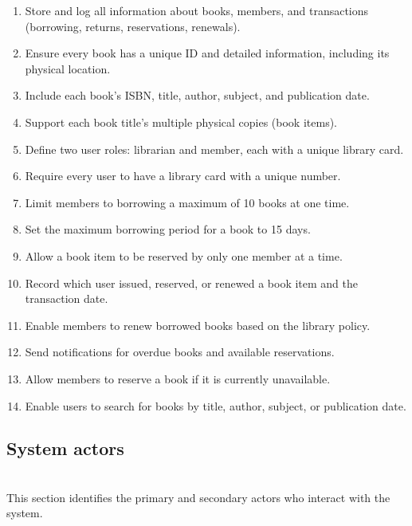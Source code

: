 \begin{enumerate}
\item
\protect{}\label{E0e4Mv41EXcNSpBeE1VU5}
Store and log all information about books, members, and transactions (borrowing, returns, reservations, renewals).
\item
\protect{}\label{2FnlvLQLyZUeJ55hdwNen}
Ensure every book has a unique ID and detailed information, including its physical location.
\item
\protect{}\label{qKTF5Ua5VyPJ6Uk3GGml0}
Include each book's ISBN, title, author, subject, and publication date.
\item
\protect{}\label{C4EsN9UHeox9osbiyhEHp}
Support each book title's multiple physical copies (book items).
\item
\protect{}\label{z6bz5WVmJlTcYEC7a_YZR}
Define two user roles: librarian and member, each with a unique library card.
\item
\protect{}\label{XsPqfVc9xmpdPGaSpIfcD}
Require every user to have a library card with a unique number.
\item
\protect{}\label{BsTG1re3UsRfRmbF-NLch}
Limit members to borrowing a maximum of 10 books at one time.
\item
\protect{}\label{hGjCag1fvoY9gC7k51-_b}
Set the maximum borrowing period for a book to 15 days.
\item
\protect{}\label{yk4tBno3dlZGtDR4sP2Iv}
Allow a book item to be reserved by only one member at a time.
\item
\protect{}\label{mRtzddxsrS84b1jXu2QZ5}
Record which user issued, reserved, or renewed a book item and the transaction date.
\item
\protect{}\label{s2KAp1nIjGcKeCe1mKRVr}
Enable members to renew borrowed books based on the library policy.
\item
\protect{}\label{wk-oEWGxL7brnWgHjl0AI}
Send notifications for overdue books and available reservations.
\item
\protect{}\label{B0jhsmGMVSAZ0sfBVXhKS}
Allow members to reserve a book if it is currently unavailable.
\item
\protect{}\label{OS3Whpbh1hTd_819t7G0d}
Enable users to search for books by title, author, subject, or publication date.
\end{enumerate}

\subsection{System actors}\label{S5RIL3SHqAlKmCkD9pNrV}
\\
This section identifies the primary and secondary actors who interact with the system.

